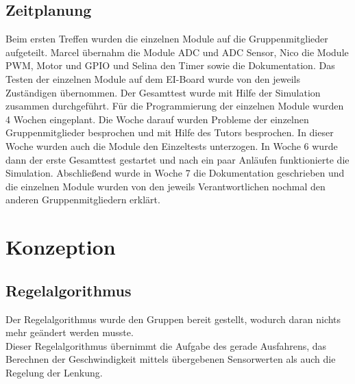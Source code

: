 \documentclass[a4paper,10pt,twoside]{report}
\begin{document}
\section{Zeitplanung}
Beim ersten Treffen wurden die einzelnen Module auf die Gruppenmitglieder aufgeteilt. Marcel übernahm die Module ADC und ADC Sensor, Nico die Module PWM, Motor und GPIO und Selina den Timer sowie die Dokumentation. Das Testen der einzelnen Module auf dem EI-Board wurde von den jeweils Zuständigen übernommen. Der Gesamttest wurde mit Hilfe der Simulation zusammen durchgeführt. Für die Programmierung der einzelnen Module wurden 4 Wochen  eingeplant. Die Woche darauf wurden Probleme der einzelnen Gruppenmitglieder besprochen und mit Hilfe des Tutors besprochen. In dieser Woche wurden auch die Module den Einzeltests unterzogen. In Woche 6 wurde dann der erste Gesamttest gestartet und nach ein paar Anläufen funktionierte die Simulation. Abschließend wurde in Woche 7 die Dokumentation geschrieben und die einzelnen Module wurden von den jeweils Verantwortlichen nochmal den anderen Gruppenmitgliedern erklärt.

\chapter{Konzeption}
\section{Regelalgorithmus}
Der Regelalgorithmus wurde den Gruppen bereit gestellt, wodurch daran nichts mehr geändert werden musste.\\
Dieser Regelalgorithmus übernimmt die Aufgabe des gerade Ausfahrens, das Berechnen der Geschwindigkeit mittels übergebenen
Sensorwerten als auch die Regelung der Lenkung.
\end{document}
